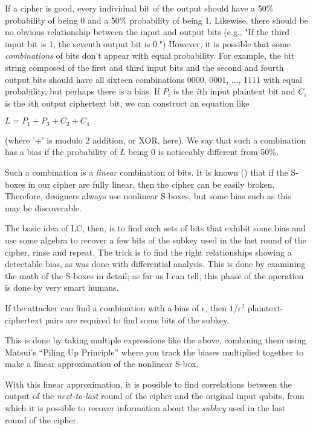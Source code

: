 If a cipher is good, every individual bit of the output should have a
50\% probability of being 0 and a 50\% probability of being 1.
Likewise, there should be no obvious relationship between the input
and output bits (e.g., "If the third input bit is 1, the seventh
output bit is 0.")  However, it is possible that some \emph{combinations}
of bits don't appear with equal probability. For example, the bit
string composed of the first and third input bits and the second and
fourth output bits should have all sixteen combinations 0000, 0001,
..., 1111 with equal probability, but perhaps there is a bias.  If $P_i$
is the $i$th input plaintext bit and $C_i$ is the $i$th output ciphertext
bit, we can construct an equation like

$L = P_1 + P_3 + C_2 + C_4$

(where '+' is modulo 2 addition, or XOR, here).  We say that such a
combination has a bias if the probability of $L$ being 0 is noticeably
different from 50\%.

Such a combination is a \emph{linear} combination of bits.  It is known () that if the S-boxes in our cipher are fully linear, then the
cipher can be easily broken.  Therefore, designers always use
nonlinear S-boxes, but some bias such as this may be discoverable.

The basic idea of LC, then, is to find such sets of bits that exhibit
some bias and use some algebra to recover a few bits of the subkey
used in the last round of the cipher, rinse and repeat.  The trick is
to find the right relationships showing a detectable bias, as was done
with differential analysis.  This is done by examining the math of the
S-boxes in detail; as far as I can tell, this phase of the operation
is done by very smart humans. \aono{}

If the attacker can find a combination with a bias of $\epsilon$, then
$1/\epsilon^2$ plaintext-ciphertext pairs are required to find some bits
of the subkey.

This is done by taking multiple expressions like the above, combining
them using Matsui's ``Piling Up Principle'' where you track the biases
multiplied together to make a linear approximation of the nonlinear
S-box.

With this linear approximation, it is possible to find correlations
between the output of the \emph{next-to-last} round of the cipher and the
original input qubits, from which it is possible to recover
information about the \emph{subkey} used in the last round of the cipher.

